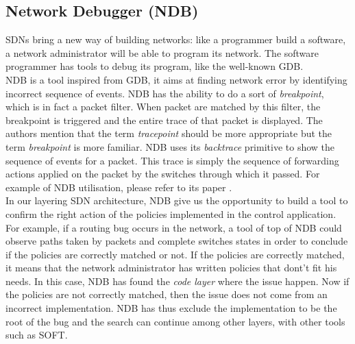 \documentclass[10pt,article]{IEEEtran}
\begin{document}
\subsection{Network Debugger (NDB)}
SDNs bring a new way of building networks: like a programmer build a software, a network administrator will be able to program its network. The software programmer has tools to debug its program, like the well-known GDB.\\
NDB is a tool inspired from GDB, it aims at finding network error by identifying incorrect sequence of events. NDB has the ability to do a sort of \textit{breakpoint}, which is in fact a packet filter. When packet are matched by this filter, the breakpoint is triggered and the entire trace of that packet is displayed. The authors mention that the term \textit{tracepoint} should be more appropriate but the term \textit{breakpoint} is more familiar. NDB uses its \textit{backtrace} primitive to show the sequence of events for a packet. This trace is simply the sequence of forwarding actions applied on the packet by the switches through which it passed. For example of NDB utilisation, please refer to its paper \cite{ndb_paper}.\\
In our layering SDN architecture, NDB give us the opportunity to build a tool to confirm the right action of the policies implemented in the control application. For example, if a routing bug occurs in the network, a tool of top of NDB could observe paths taken by packets and complete switches states in order to conclude if the policies are correctly matched or not. If the policies are correctly matched, it means that the network administrator has written policies that dont't fit his needs. In this case, NDB has found the \textit{code layer} where the issue happen. Now if the policies are not correctly matched, then the issue does not come from an incorrect implementation. NDB has thus exclude the implementation to be the root of the bug and the search can continue among other layers, with other tools such as SOFT\cite{SOFT}.
\end{document}
